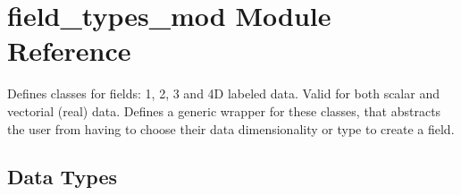 \hypertarget{namespacefield__types__mod}{}\section{field\+\_\+types\+\_\+mod Module Reference}
\label{namespacefield__types__mod}


Defines classes for \textquotesingle{}fields\textquotesingle{}\+: 1, 2, 3 and 4D labeled data. Valid for both scalar and vectorial (real) data. Defines a generic wrapper for these classes, that abstracts the user from having to choose their data dimensionality or type to create a field.  


\subsection*{Data Types}
